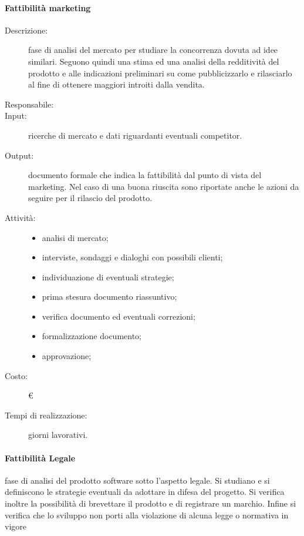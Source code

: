 \paragraph{Fattibilità marketing}
\begin{description}
\item[Descrizione:] fase di analisi del mercato per studiare la concorrenza dovuta ad idee similari. Seguono quindi una stima ed una analisi della redditività del prodotto e alle indicazioni preliminari su come pubblicizzarlo e rilasciarlo al fine di ottenere maggiori introiti dalla vendita.
\item[Responsabile:] 
\item[Input:] ricerche di mercato e dati riguardanti eventuali competitor.
\item[Output:] documento formale che indica la fattibilità dal punto di vista del marketing. Nel caso di una buona riuscita sono riportate anche le azioni da seguire per il rilascio del prodotto.
\item[Attività:]
\begin{itemize}
\item analisi di mercato;
\item interviste, sondaggi e dialoghi con possibili clienti;
\item individuazione di eventuali strategie;
\item prima stesura documento riassuntivo;
\item verifica documento ed eventuali correzioni;
\item formalizzazione documento;
\item approvazione;
\end{itemize}
\item[Costo:] \euro{}
\item[Tempi di realizzazione:]  giorni lavorativi.
\end{description}
\paragraph{Fattibilità Legale}

\item[Descrizione:] fase di analisi del prodotto software sotto l'aspetto legale. Si studiano e
si definiscono le strategie eventuali da adottare in difesa del progetto. Si verifica inoltre
la possibilità di brevettare il prodotto e di registrare un marchio. Infine si verifica che
lo sviluppo non porti alla violazione di alcuna legge o normativa in vigore\\

